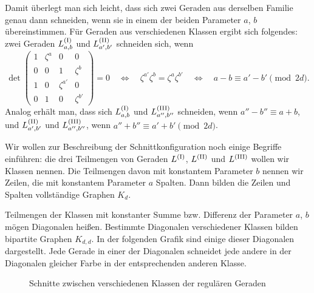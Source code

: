 Damit überlegt man sich leicht, dass sich zwei Geraden aus derselben Familie genau dann schneiden, wenn sie in einem der beiden Parameter $a$, $b$ übereinstimmen. Für Geraden aus verschiedenen Klassen ergibt sich folgendes: zwei Geraden $\Lcl(I)_{a,b}$ und $\Lcl(II)_{a',b'}$ schneiden sich, wenn
\begin{equation}
\det \begin{pmatrix}
1 & \zeta^a & 0 & 0 \\
0 & 0 & 1 & \zeta^b \\
1 & 0 & \zeta^{a'} & 0 \\
0 & 1 & 0 & \zeta^{b'}
\end{pmatrix} = 0 \quad\Longleftrightarrow\quad \zeta^{a'} \zeta^b = \zeta^a \zeta^{b'} \quad\Leftrightarrow\quad a-b \equiv a'-b' \pmod{2d}.
\end{equation}
Analog erhält man, dass sich $\Lcl(I)_{a,b}$ und $\Lcl(III)_{a'',b''}$ schneiden, wenn $a''-b'' \equiv a+b$, und $\Lcl(II)_{a',b'}$ und $\Lcl(III)_{a'',b''}$, wenn $a''+b'' \equiv a'+b' \pmod{2d}$.

Wir wollen zur Beschreibung der Schnittkonfiguration noch einige Begriffe einführen: die drei Teilmengen von Geraden $\Lcl(I)$, $\Lcl(II)$ und $\Lcl(III)$ wollen wir Klassen nennen. Die Teilmengen davon mit konstantem Parameter $b$ nennen wir Zeilen, die mit konstantem Parameter $a$ Spalten. Dann bilden die Zeilen und Spalten vollständige Graphen $K_d$.

Teilmengen der Klassen mit konstanter Summe bzw. Differenz der Parameter $a$, $b$ mögen Diagonalen heißen. Bestimmte Diagonalen verschiedener Klassen bilden bipartite Graphen $K_{d,d}$. In der folgenden Grafik sind einige dieser Diagonalen dargestellt. Jede Gerade in einer der Diagonalen schneidet jede andere in der Diagonalen gleicher Farbe in der entsprechenden anderen Klasse.

\begin{figure}[h]
\centering
{}
\caption{Schnitte zwischen verschiedenen Klassen der regulären Geraden}\label{fig:reg}
\end{figure}

